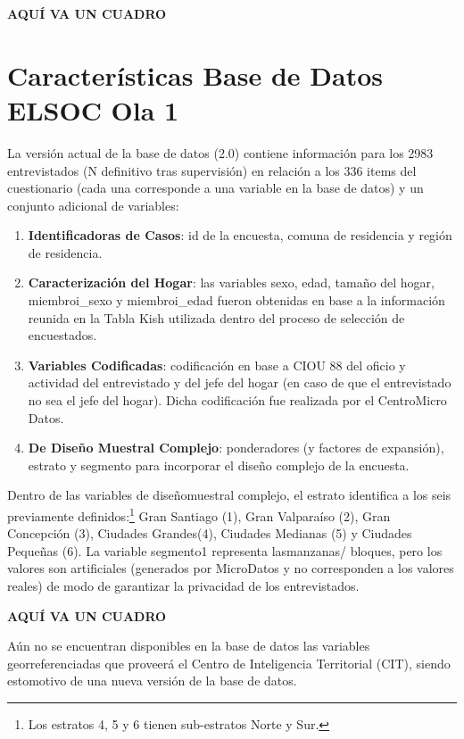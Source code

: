\documentclass[
]{book}
\begin{document}
\textbf{AQUÍ VA UN CUADRO}

\hypertarget{caracteruxedsticas-base-de-datos-elsoc-ola-1}{%
\section{Características Base de Datos ELSOC Ola
1}\label{caracteruxedsticas-base-de-datos-elsoc-ola-1}}

La versión actual de la base de datos (2.0) contiene información para
los 2983 entrevistados (N definitivo tras supervisión) en relación a los
336 items del cuestionario (cada una corresponde a una variable en la
base de datos) y un conjunto adicional de variables:

\begin{enumerate}
\def\labelenumi{\arabic{enumi}.}
\item
  \textbf{Identificadoras de Casos}: id de la encuesta, comuna de
  residencia y región de residencia.
\item
  \textbf{Caracterización del Hogar}: las variables sexo, edad, tamaño
  del hogar, miembroi\_sexo y miembroi\_edad fueron obtenidas en base a
  la información reunida en la Tabla Kish utilizada dentro del proceso
  de selección de encuestados.
\item
  \textbf{Variables Codificadas}: codificación en base a CIOU 88 del
  oficio y actividad del entrevistado y del jefe del hogar (en caso de
  que el entrevistado no sea el jefe del hogar). Dicha codificación fue
  realizada por el CentroMicro Datos.
\item
  \textbf{De Diseño Muestral Complejo}: ponderadores (y factores de
  expansión), estrato y segmento para incorporar el diseño complejo de
  la encuesta.
\end{enumerate}

Dentro de las variables de diseñomuestral complejo, el estrato
identifica a los seis previamente definidos:\footnote{Los estratos 4, 5
  y 6 tienen sub-estratos Norte y Sur.} Gran Santiago (1), Gran
Valparaíso (2), Gran Concepción (3), Ciudades Grandes(4), Ciudades
Medianas (5) y Ciudades Pequeñas (6). La variable segmento1 representa
lasmanzanas/ bloques, pero los valores son artificiales (generados por
MicroDatos y no corresponden a los valores reales) de modo de garantizar
la privacidad de los entrevistados.

\textbf{AQUÍ VA UN CUADRO}

Aún no se encuentran disponibles en la base de datos las variables
georreferenciadas que proveerá el Centro de Inteligencia Territorial
(CIT), siendo estomotivo de una nueva versión de la base de datos.
\end{document}
